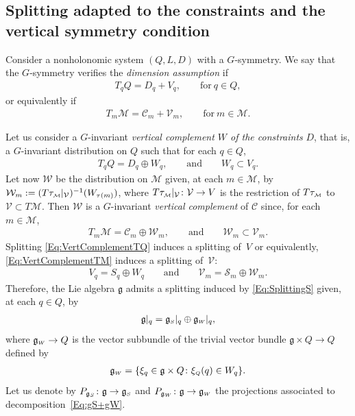 \documentclass[pdftex]{sigma}
\numberwithin{equation}{section}
\def\W{\mathcal{W}}
\def\M{\mathcal{M}}
\def\V{\mathcal{V}}
\def\S{\mathcal{S}}
\def\C{\mathcal{C}}
\def\g{\mathfrak{g}}
\def\subM{{\mbox{\tiny{$\M$}}}}
\def\subSS{{\mbox{\tiny{$S$}}}}
\def\subWW{{\mbox{\tiny{$W$}}}}
\def\subQQ{{\mbox{\tiny{$Q$}}}}
\begin{document}
\subsection{Splitting adapted to the constraints and the vertical symmetry condition}

Consider a nonholonomic system $(Q,L,D)$ with a $G$-symmetry.
We say that the $G$-symmetry verif\/ies the {\it dimension assumption} if
\begin{gather} \label{Eq:DimAssumptionTQ}
 T_qQ = D_q +V_q  , \qquad \mbox{for} \ q \in Q,
\end{gather}
or equivalently if
\begin{gather*}
  T_m\M = \C_m + \V_m, \qquad \textrm{for} \ m\in \M.
\end{gather*}

Let us consider a $G$-invariant {\it vertical complement $W$ of the constraints}
$D$, that is, a $G$-invariant distribution on $Q$ such that for each $q \in Q$,
\begin{gather}\label{Eq:VertComplementTQ}
T_qQ = D_q \oplus W_q, \qquad \mbox{and} \qquad W_q \subset V_q.
\end{gather}
Let now $\W$ be the distribution on $\M$ given, at each $m\in \M$, by
$\W_m := (T\tau_\subM|_\V)^{-1}(W_{\tau(m)})$, where $T\tau_\subM|_\V \colon \V \to V$
is the restriction of $T\tau_\subM$ to $\V\subset T\M$. Then $\W$ is a $G$-invariant
{\it vertical complement} of $\C$ since, for each $m\in\M$,
\begin{gather}\label{Eq:VertComplementTM}
T_m\M = \C_m \oplus \W_m, \qquad \mbox{and} \qquad \W_m \subset \V_m.
\end{gather}
Splitting \eqref{Eq:VertComplementTQ} induces a splitting of~$V$ or equivalently, \eqref{Eq:VertComplementTM} induces a splitting of~$\V$:
\begin{gather}\label{Eq:SplittingS}
V_q = S_q \oplus W_q \qquad \mbox{and} \qquad \V_m = \S_m \oplus \W_m.
\end{gather}
Therefore, the Lie algebra $\g$ admits a splitting induced by \eqref{Eq:SplittingS} given, at each $q\in Q$, by
\begin{gather} \label{Eq:gS+gW}
\mathfrak{g}|_q = \mathfrak{g}_\subSS |_q \oplus \mathfrak{g}_\subWW |_q,
\end{gather}
where  $\mathfrak{g}_\subWW\to Q$ is the vector subbundle of the trivial vector bundle $\mathfrak{g}\times Q \to Q$ def\/ined by
\begin{gather*} %
 \mathfrak{g}_\subWW = \{ \xi _q \in \mathfrak{g}\times Q \colon \xi_\subQQ(q) \in W_q\}.
\end{gather*}
Let us denote by $P_{\mathfrak{g}_S}\colon \mathfrak{g}\to \mathfrak{g}_\subSS$
and $P_{\mathfrak{g}_W}\colon \mathfrak{g}\to \mathfrak{g}_\subWW$  the
projections associated to decomposition~\eqref{Eq:gS+gW}.
\end{document}
